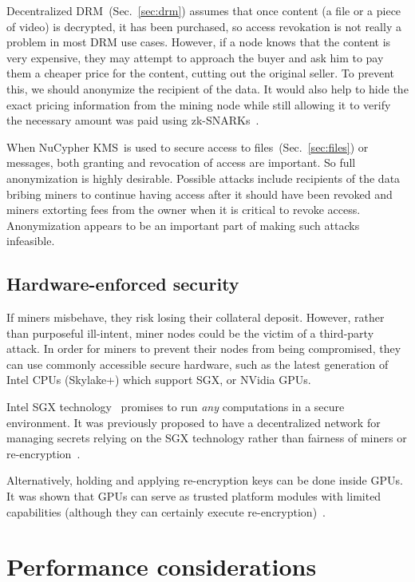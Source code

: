 \documentclass[longbibliography,nofootinbib]{revtex4-1}
\newcommand{\kms}{NuCypher KMS}
\begin{document}
Decentralized DRM~(Sec.~\ref{sec:drm}) assumes that once content (a file or a piece of video) is decrypted, it has been purchased,
so access revokation is not really a problem in most DRM use cases.
However, if a node knows that the content is very expensive, they may attempt to approach the buyer and ask him to pay them a cheaper price for the
content, cutting out the original seller.
To prevent this, we should anonymize the recipient of the data.
It would also help to hide the exact pricing information from the mining node while still allowing it to verify the necessary amount was paid using
zk-SNARKs~\cite{consensys-snarks}.

When \kms~is used to secure access to files~(Sec.~\ref{sec:files}) or messages, both granting and revocation of access are important.
So full anonymization is highly desirable.
Possible attacks include recipients of the data bribing miners to continue having access after it should have been revoked and
miners extorting fees from the owner when it is critical to revoke access.
Anonymization appears to be an important part of making such attacks infeasible.

\subsection{Hardware-enforced security}

If miners misbehave, they risk losing their collateral deposit.
However, rather than purposeful ill-intent, miner nodes could be the victim of a third-party attack.
In order for miners to prevent their nodes from being compromised, they can use commonly accessible secure hardware,
such as the latest generation of Intel CPUs (Skylake+) which support SGX, or NVidia GPUs.

Intel SGX technology~\cite{wiki:sgx} promises to run \emph{any} computations in a secure environment.
It was previously proposed to have a decentralized network for managing secrets relying on the SGX technology rather than fairness of
miners or re-encryption~\cite{sgx-blockchain-encryption}.

Alternatively, holding and applying re-encryption keys can be done inside GPUs.
It was shown that GPUs can serve as trusted platform modules with limited capabilities (although they can certainly execute
re-encryption)~\cite{gpu-trusted}.

\section{Performance considerations}
\end{document}

